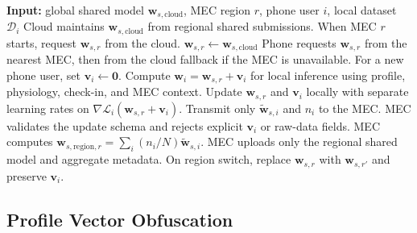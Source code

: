 \documentclass[lettersize,journal]{IEEEtran}
\begin{document}
\begin{algorithm}[!t]
\caption{Personalized hierarchical federated learning}
\label{alg:pfl}
\begin{algorithmic}[1]
\STATE \textbf{Input:} global shared model
$\mathbf{w}_{s,\mathrm{cloud}}$, MEC region $r$, phone user $i$, local
dataset $\mathcal{D}_i$
\STATE Cloud maintains $\mathbf{w}_{s,\mathrm{cloud}}$ from regional
shared submissions.
\STATE When MEC $r$ starts, request $\mathbf{w}_{s,r}$ from the cloud.
    \STATE $\mathbf{w}_{s,r} \leftarrow
    \mathbf{w}_{s,\mathrm{cloud}}$
\ENDIF
\STATE Phone requests $\mathbf{w}_{s,r}$ from the nearest MEC, then from
the cloud fallback if the MEC is unavailable.
\STATE For a new phone user, set $\mathbf{v}_i \leftarrow \mathbf{0}$.
\STATE Compute $\mathbf{w}_i=\mathbf{w}_{s,r}+\mathbf{v}_i$ for local
inference using profile, physiology, check-in, and MEC context.
\STATE Update $\mathbf{w}_{s,r}$ and $\mathbf{v}_i$ locally with
separate learning rates on
$\nabla\mathcal{L}_i(\mathbf{w}_{s,r}+\mathbf{v}_i)$.
\STATE Transmit only $\tilde{\mathbf{w}}_{s,i}$ and $n_i$ to the MEC.
\STATE MEC validates the update schema and rejects explicit
$\mathbf{v}_i$ or raw-data fields.
\STATE MEC computes $\mathbf{w}_{s,\mathrm{region},r} =
\sum_i(n_i/N)\tilde{\mathbf{w}}_{s,i}$.
\STATE MEC uploads only the regional shared model and aggregate metadata.
\STATE On region switch, replace $\mathbf{w}_{s,r}$ with
$\mathbf{w}_{s,r'}$ and preserve $\mathbf{v}_i$.
\end{algorithmic}
\end{algorithm}

\subsection{Profile Vector Obfuscation}
\end{document}
